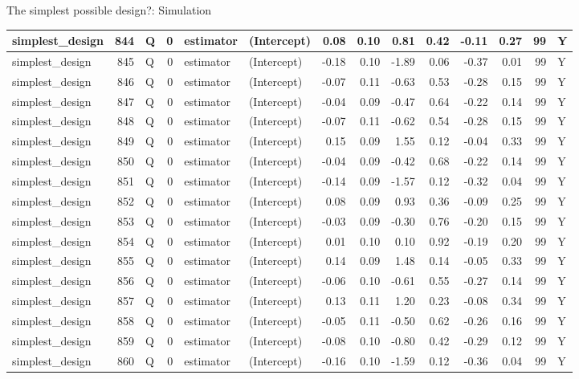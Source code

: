 \documentclass[
  11pt,
  ignorenonframetext,
]{beamer}
\begin{document}
\begin{frame}[fragile]{The simplest possible design?: Simulation}
\begin{tabular}{l|r|l|r|l|l|r|r|r|r|r|r|r|l}
\hline
simplest\_design & 844 & Q & 0 & estimator & (Intercept) & 0.08 & 0.10 & 0.81 & 0.42 & -0.11 & 0.27 & 99 & Y\\
\hline
simplest\_design & 845 & Q & 0 & estimator & (Intercept) & -0.18 & 0.10 & -1.89 & 0.06 & -0.37 & 0.01 & 99 & Y\\
\hline
simplest\_design & 846 & Q & 0 & estimator & (Intercept) & -0.07 & 0.11 & -0.63 & 0.53 & -0.28 & 0.15 & 99 & Y\\
\hline
simplest\_design & 847 & Q & 0 & estimator & (Intercept) & -0.04 & 0.09 & -0.47 & 0.64 & -0.22 & 0.14 & 99 & Y\\
\hline
simplest\_design & 848 & Q & 0 & estimator & (Intercept) & -0.07 & 0.11 & -0.62 & 0.54 & -0.28 & 0.15 & 99 & Y\\
\hline
simplest\_design & 849 & Q & 0 & estimator & (Intercept) & 0.15 & 0.09 & 1.55 & 0.12 & -0.04 & 0.33 & 99 & Y\\
\hline
simplest\_design & 850 & Q & 0 & estimator & (Intercept) & -0.04 & 0.09 & -0.42 & 0.68 & -0.22 & 0.14 & 99 & Y\\
\hline
simplest\_design & 851 & Q & 0 & estimator & (Intercept) & -0.14 & 0.09 & -1.57 & 0.12 & -0.32 & 0.04 & 99 & Y\\
\hline
simplest\_design & 852 & Q & 0 & estimator & (Intercept) & 0.08 & 0.09 & 0.93 & 0.36 & -0.09 & 0.25 & 99 & Y\\
\hline
simplest\_design & 853 & Q & 0 & estimator & (Intercept) & -0.03 & 0.09 & -0.30 & 0.76 & -0.20 & 0.15 & 99 & Y\\
\hline
simplest\_design & 854 & Q & 0 & estimator & (Intercept) & 0.01 & 0.10 & 0.10 & 0.92 & -0.19 & 0.20 & 99 & Y\\
\hline
simplest\_design & 855 & Q & 0 & estimator & (Intercept) & 0.14 & 0.09 & 1.48 & 0.14 & -0.05 & 0.33 & 99 & Y\\
\hline
simplest\_design & 856 & Q & 0 & estimator & (Intercept) & -0.06 & 0.10 & -0.61 & 0.55 & -0.27 & 0.14 & 99 & Y\\
\hline
simplest\_design & 857 & Q & 0 & estimator & (Intercept) & 0.13 & 0.11 & 1.20 & 0.23 & -0.08 & 0.34 & 99 & Y\\
\hline
simplest\_design & 858 & Q & 0 & estimator & (Intercept) & -0.05 & 0.11 & -0.50 & 0.62 & -0.26 & 0.16 & 99 & Y\\
\hline
simplest\_design & 859 & Q & 0 & estimator & (Intercept) & -0.08 & 0.10 & -0.80 & 0.42 & -0.29 & 0.12 & 99 & Y\\
\hline
simplest\_design & 860 & Q & 0 & estimator & (Intercept) & -0.16 & 0.10 & -1.59 & 0.12 & -0.36 & 0.04 & 99 & Y\\

\end{tabular}
\end{frame}
\end{document}
